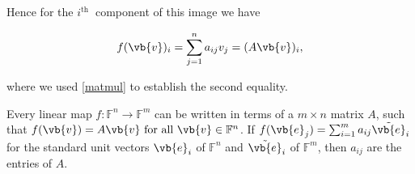 \documentclass[a4paper,12pt]{report}
\begin{document}
Hence for the \(i^{\text{th }} \) component of this image we have

\begin{equation}
    f(\vb{v} )_{i} = \sum_{j=1}^{n} a_{ij} v_{j} = (A\vb{v} )_{i},  
\end{equation}

where we used \cref{matmul} to establish the second equality.

\begin{lemma}\label{matrixlinearmap} 
Every linear map \(f: \mathbb{F}^{n} \rightarrow \mathbb{F}^{m}  \) can be written in terms of a \(m \times  n\) matrix \(A\), such that \(f(\vb{v} ) = A\vb{v} \text{ for all } \vb{v} \in \mathbb{F}^{n} \). If \(f(\vb{e} _{j} ) = \sum_{i=1}^{m} a_{ij} \tilde{\vb{e} } _{i} \) for the standard unit vectors \(\vb{e} _{i} \) of \(\mathbb{F}^{n} \) and \(\tilde{\vb{e} } _{i} \) of \(\mathbb{F}^{m} \), then \(a_{ij} \) are the entries of \(A\).         
\end{lemma}
\end{document}
